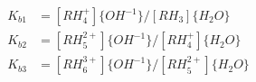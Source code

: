 \documentclass[fleqn, oneside, 11pt]{article}%
\begin{document}
\begin{preview}
\begin{align*}%
K_{b1} & = [RH^{+}_{4}] \{ OH^{-1} \} / [RH_{3}] \{ H_{2}O \} \nonumber \\ 
K_{b2} & = [RH^{2+}_{5}] \{ OH^{-1} \} / [RH^{+}_{4}] \{ H_{2}O \} \nonumber \\ 
K_{b3} & = [RH^{3+}_{6}] \{ OH^{-1} \} / [RH^{2+}_{5}] \{ H_{2}O \} \nonumber \\ 
\end{align*} 
\end{preview}
\end{document}
